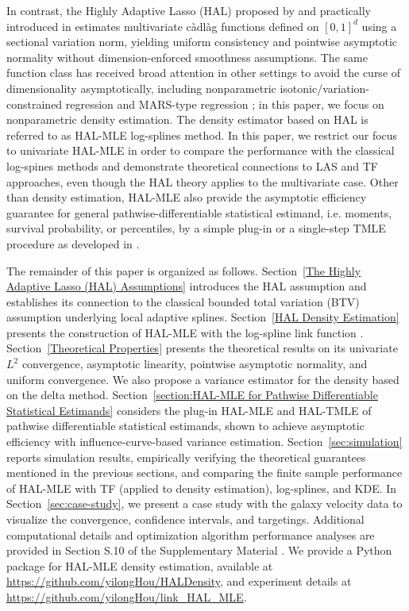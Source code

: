 In contrast, the Highly Adaptive Lasso (HAL) proposed by \citet{van2017generally} and practically introduced in  \citet{benkeser2016highly} estimates multivariate càdlàg functions defined on $[0,1]^d$ using a sectional variation norm, yielding uniform consistency and pointwise asymptotic normality without dimension-enforced smoothness assumptions. The same function class has received broad attention in other settings to avoid the curse of dimensionality asymptotically, including nonparametric isotonic/variation-constrained regression \citep{fang2021multivariate} and MARS-type regression \citep{ki2024mars}; in this paper, we focus on nonparametric density estimation. The density estimator based on HAL is referred to as HAL-MLE log-splines method. In this paper, we restrict our focus to univariate HAL-MLE in order to compare the performance with the classical log-spines methods and demonstrate theoretical connections to LAS and TF approaches, even though the HAL theory applies to the multivariate case. Other than density estimation, HAL-MLE also provide the asymptotic efficiency guarantee for general pathwise-differentiable statistical estimand, i.e. moments, survival probability, or percentiles, by a simple plug-in or a single-step TMLE procedure as developed in \citet{van2017generally, van2023efficient}.

The remainder of this paper is organized as follows. Section~\ref{The Highly Adaptive Lasso (HAL) Assumptions} introduces the HAL assumption and establishes its connection to the classical bounded total variation (BTV) assumption underlying local adaptive splines. Section~\ref{HAL Density Estimation} presents the construction of HAL-MLE with the log-spline link function \citep{leonard1978density, silverman1982estimation, kooperberg1992logspline, rytgaard2023estimation}. Section~\ref{Theoretical Properties} presents the theoretical results on its univariate $L^2$ convergence, asymptotic linearity, pointwise asymptotic normality, and uniform convergence. We also propose a variance estimator for the density based on the delta method. Section~\ref{section:HAL-MLE for Pathwise Differentiable Statistical Estimands} considers the plug-in HAL-MLE and HAL-TMLE of pathwise differentiable statistical estimands, shown to achieve asymptotic efficiency with influence-curve-based variance estimation. Section~\ref{sec:simulation} reports simulation results, empirically verifying the theoretical guarantees mentioned in the previous sections, and comparing the finite sample performance of HAL-MLE with TF (applied to density estimation), log-splines, and KDE. In Section~\ref{sec:case-study}, we present a case study with the galaxy velocity data to visualize the convergence, confidence intervals, and targetings. Additional computational details and optimization algorithm performance analyses are provided in Section S.10 of the Supplementary Material \citep{hou2026supplement}. We provide a Python package for HAL-MLE density estimation, available at \url{https://github.com/yilongHou/HALDensity}, and experiment details at \url{https://github.com/yilongHou/link_HAL_MLE}.
